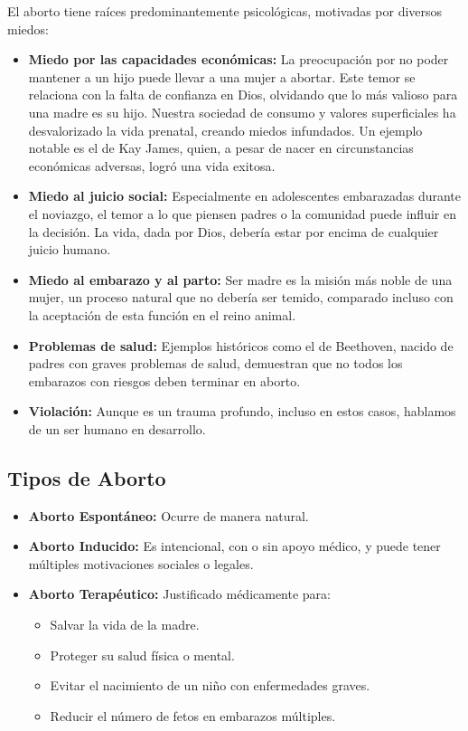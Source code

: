 \documentclass[
  jou,
  floatsintext,
  longtable,
  a4paper,
  nolmodern,
  notxfonts,
  notimes,
  12pt,
  colorlinks=true,linkcolor=blue,citecolor=blue,urlcolor=blue]{apa7}
\providecommand{\tightlist}{%
  \setlength{\itemsep}{0pt}\setlength{\parskip}{0pt}}
\begin{document}
El aborto tiene raíces predominantemente psicológicas, motivadas por
diversos miedos:

\begin{itemize}
\item
  \textbf{Miedo por las capacidades económicas:} La preocupación por no
  poder mantener a un hijo puede llevar a una mujer a abortar. Este
  temor se relaciona con la falta de confianza en Dios, olvidando que lo
  más valioso para una madre es su hijo. Nuestra sociedad de consumo y
  valores superficiales ha desvalorizado la vida prenatal, creando
  miedos infundados. Un ejemplo notable es el de Kay James, quien, a
  pesar de nacer en circunstancias económicas adversas, logró una vida
  exitosa.
\item
  \textbf{Miedo al juicio social:} Especialmente en adolescentes
  embarazadas durante el noviazgo, el temor a lo que piensen padres o la
  comunidad puede influir en la decisión. La vida, dada por Dios,
  debería estar por encima de cualquier juicio humano.
\item
  \textbf{Miedo al embarazo y al parto:} Ser madre es la misión más
  noble de una mujer, un proceso natural que no debería ser temido,
  comparado incluso con la aceptación de esta función en el reino
  animal.
\item
  \textbf{Problemas de salud:} Ejemplos históricos como el de Beethoven,
  nacido de padres con graves problemas de salud, demuestran que no
  todos los embarazos con riesgos deben terminar en aborto.
\item
  \textbf{Violación:} Aunque es un trauma profundo, incluso en estos
  casos, hablamos de un ser humano en desarrollo.
\end{itemize}

\subsection{Tipos de Aborto}\label{tipos-de-aborto}

\begin{itemize}
\item
  \textbf{Aborto Espontáneo:} Ocurre de manera natural.
\item
  \textbf{Aborto Inducido:} Es intencional, con o sin apoyo médico, y
  puede tener múltiples motivaciones sociales o legales.
\item
  \textbf{Aborto Terapéutico:} Justificado médicamente para:

  \begin{itemize}
  \tightlist
  \item
    Salvar la vida de la madre.
  \item
    Proteger su salud física o mental.
  \item
    Evitar el nacimiento de un niño con enfermedades graves.
  \item
    Reducir el número de fetos en embarazos múltiples.
  \end{itemize}
\end{itemize}
\end{document}
